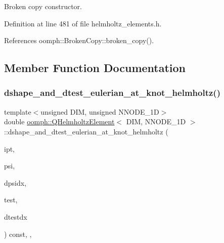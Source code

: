 Broken copy constructor. 



Definition at line 481 of file helmholtz\+\_\+elements.\+h.



References oomph\+::\+Broken\+Copy\+::broken\+\_\+copy().



\subsection{Member Function Documentation}
\mbox{\label{classoomph_1_1QHelmholtzElement_ade0cbf9a26ee1ac1f64fd999d8903a72}} 
\subsubsection{\texorpdfstring{dshape\+\_\+and\+\_\+dtest\+\_\+eulerian\+\_\+at\+\_\+knot\+\_\+helmholtz()}{dshape\_and\_dtest\_eulerian\_at\_knot\_helmholtz()}}
{\footnotesize\ttfamily template$<$unsigned D\+IM, unsigned N\+N\+O\+D\+E\+\_\+1D$>$ \\
double \hyperlink{classoomph_1_1QHelmholtzElement}{oomph\+::\+Q\+Helmholtz\+Element}$<$ D\+IM, N\+N\+O\+D\+E\+\_\+1D $>$\+::dshape\+\_\+and\+\_\+dtest\+\_\+eulerian\+\_\+at\+\_\+knot\+\_\+helmholtz (\begin{DoxyParamCaption}\item[{const unsigned \&}]{ipt,  }\item[{\hyperlink{classoomph_1_1Shape}{Shape} \&}]{psi,  }\item[{\hyperlink{classoomph_1_1DShape}{D\+Shape} \&}]{dpsidx,  }\item[{\hyperlink{classoomph_1_1Shape}{Shape} \&}]{test,  }\item[{\hyperlink{classoomph_1_1DShape}{D\+Shape} \&}]{dtestdx }\end{DoxyParamCaption}) const\hspace{0.3cm}{\ttfamily [inline]}, {\ttfamily [protected]}, {\ttfamily [virtual]}}



